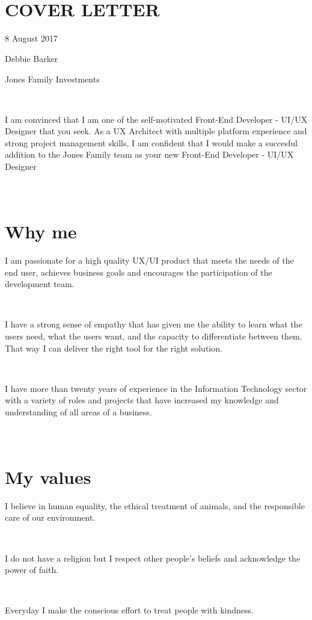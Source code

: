 \documentclass{resume}
\begin{document}



\section{\\ COVER LETTER}
  \role{}{}
  8 August 2017\par
  Debbie Barker\par
  Jones Family Investments\par
  ~\par
  I am convinced that I am one of the self-motivated Front-End Developer - UI/UX Designer that you seek. As a UX Architect with multiple platform experience and strong project management skills, I am confident that I would make a succesful addition to the Jones Family team as your new Front-End Developer - UI/UX Designer
  \par

\section{\\ Why me}
  \role{}{}
  I am passionate for a high quality UX/UI product that meets the needs of the end user, achieves business goals and encourages the participation of the development team.\par
  ~\par
  I have a strong sense of empathy that has given me the ability to learn what the users need, what the users want, and the capacity to differentiate between them. That way I can deliver the right tool for the right solution.\par
  ~\par
  I have more than twenty years of experience in the Information Technology sector with a variety of roles and projects that have increased my knowledge and understanding of all areas of a business.\par

\section{\\ My values}
  \role{}{}
  I believe in human equality, the ethical treatment of animals, and the responsible care of our environment.\par
  ~\par
  I do not have a religion but I respect other people's beliefs and acknowledge the power of faith.\par
  ~\par
  Everyday I make the conscious effort to treat people with kindness.\par
\end{document}
